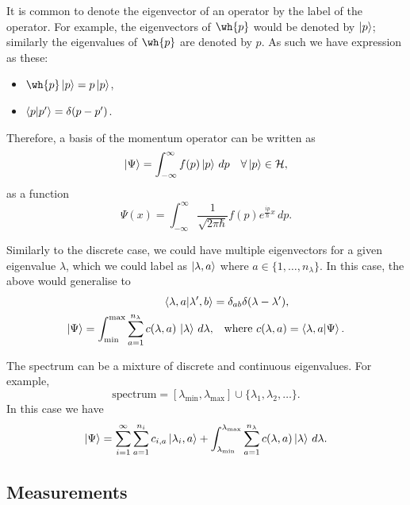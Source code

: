 \documentclass[12pt, a4paper]{article}
\begin{document}
\begin{mdremark}
    It is common to denote the eigenvector of an operator by the label of the operator. For example, the eigenvectors of \(\wh{p}\) would be denoted by \(\ket{p}\); similarly the eigenvalues of \(\wh{p}\) are denoted by \(p\). As such we have expression as these:
    \begin{itemize}
        \item \(\wh{p} \ket{p} = p \ket{p}\),
        \item \(\bra{p} \ket{p'} = \delta(p-p')\).
    \end{itemize}
    Therefore, a basis of the momentum operator can be written as 
    \[\ket{\Psi} = \int_{-\infty}^{\infty} f(p) \ket{p} \, dp \quad \forall \ket{p} \in \mathcal{H},\]
    as a function 
    \[\Psi(x) = \int_{-\infty}^{\infty} \frac{1}{\sqrt{2\pi \hbar}} f(p) e^{\frac{ip}{\hbar}x} \, dp.\]
\end{mdremark}

\begin{mdremark}
    Similarly to the discrete case, we could have multiple eigenvectors for a given eigenvalue \(\lambda\), which we could label as \(\ket{\lambda,a}\) where \(a \in \{1,\ldots, n_{\lambda}\}\). In this case, the above would generalise to 
    \[\begin{aligned}
        \bra{\lambda,a} \ket{\lambda',b} &= \delta_{ab} \delta(\lambda-\lambda'), \\
        \ket{\Psi} = \int_{\min}^{\max} \sum_{a=1}^{n_{\lambda}} c(\lambda,a) \, \ket{\lambda} \, d\lambda, &\quad \text{where } c(\lambda,a) = \bra{\lambda,a} \ket{\Psi}.
    \end{aligned}\]
\end{mdremark}

\begin{mdremark}
    The spectrum can be a mixture of discrete and continuous eigenvalues. For example,
    \[\text{spectrum} = [\lambda_{\min},\lambda_{\max}] \cup \{\lambda_1,\lambda_2,\ldots\}.\]
    In this case we have 
    \[\ket{\Psi} = \sum_{i=1}^{\infty} \sum_{a=1}^{n_i} c_{i,a} \ket{\lambda_i,a}+\int_{\lambda_{\text{min}}}^{\lambda_{\text{max}}} \sum_{a=1}^{n_{\lambda}} c(\lambda,a) \ket{\lambda} \, d\lambda.\]
\end{mdremark}

\subsection{Measurements}
\end{document}
